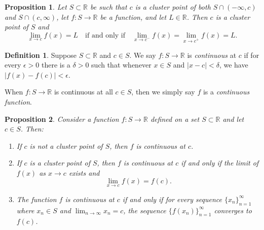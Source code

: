 \documentclass{article}
\newtheorem{proposition}{Proposition}[section]
\theoremstyle{definition}
\newtheorem{definition}{Definition}[section]
\theoremstyle{remark}
\begin{document}
\vspace{.5cm}
\begin{proposition}
Let $S \subset \mathbb{R}$ be such that $c$ is a cluster point of both $S \cap (-\infty, c)$ and $S \cap (c, \infty)$, let $f : S \to \mathbb{R}$ be a function, and let $L \in \mathbb{R}$. Then $c$ is a cluster point of $S$ and
\[
\lim_{x\to c} f(x) = L \quad \text{if and only if} \quad \lim_{x\to c^-} f(x) = \lim_{x\to c^+} f(x) = L.
\]
\end{proposition}


\vspace{.5cm}
\begin{definition}
Suppose $S \subset \mathbb{R}$ and $c \in S$. We say $f : S \to \mathbb{R}$ is \textit{continuous} at $c$ if for every $\epsilon > 0$ there is a $\delta > 0$ such that whenever $x \in S$ and $|x - c| < \delta$, we have $|f(x) - f(c)| < \epsilon$.

When $f : S \to \mathbb{R}$ is continuous at all $c \in S$, then we simply say $f$ is a \textit{continuous function}.
\end{definition}



\vspace{.5cm}
\begin{proposition}
Consider a function $f : S \to \mathbb{R}$ defined on a set $S \subset \mathbb{R}$ and let $c \in S$. Then:
\begin{enumerate}
\item If $c$ is not a cluster point of $S$, then $f$ is continuous at $c$.
\item If $c$ is a cluster point of $S$, then $f$ is continuous at $c$ if and only if the limit of $f(x)$ as $x \to c$ exists and
\[
\lim_{x\to c} f(x) = f(c).
\]
\item The function $f$ is continuous at $c$ if and only if for every sequence $\{x_n\}_{n=1}^{\infty}$ where $x_n \in S$ and $\lim_{n\to\infty} x_n = c$, the sequence $\{f(x_n)\}_{n=1}^{\infty}$ converges to $f(c)$.
\end{enumerate}
\end{proposition}
\end{document}
